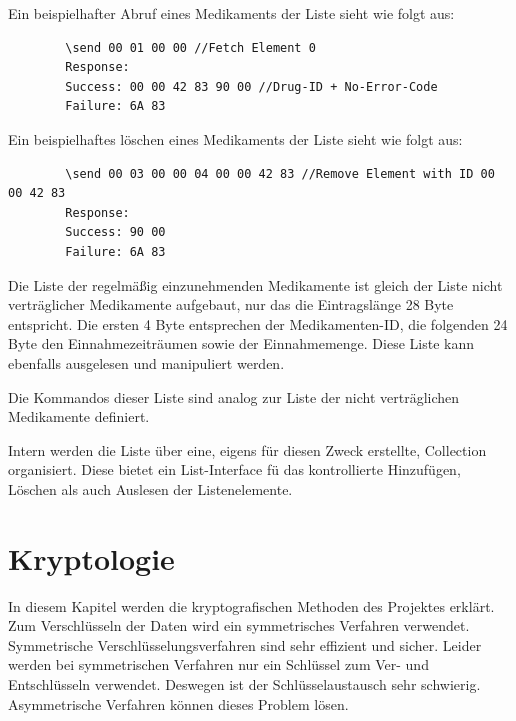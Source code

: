 \documentclass[parskip]{scrartcl}
\begin{document}
	Ein beispielhafter Abruf eines Medikaments der Liste sieht wie folgt aus:
	
	\begin{lstlisting}
		\send 00 01 00 00 //Fetch Element 0
		Response:
		Success: 00 00 42 83 90 00 //Drug-ID + No-Error-Code
		Failure: 6A 83
	\end{lstlisting}
	
	Ein beispielhaftes löschen eines Medikaments der Liste sieht wie folgt aus:
		
	\begin{lstlisting}
		\send 00 03 00 00 04 00 00 42 83 //Remove Element with ID 00 00 42 83
		Response:
		Success: 90 00
		Failure: 6A 83
	\end{lstlisting}
	
	Die Liste der regelmäßig einzunehmenden Medikamente ist gleich der Liste nicht verträglicher Medikamente aufgebaut, nur das die Eintragslänge 28 Byte entspricht. Die ersten 4 Byte entsprechen der Medikamenten-ID, die folgenden 24 Byte den Einnahmezeiträumen sowie der Einnahmemenge. Diese Liste kann ebenfalls ausgelesen und manipuliert werden.
	
	Die Kommandos dieser Liste sind analog zur Liste der nicht verträglichen Medikamente definiert.
	
	Intern werden die Liste über eine, eigens für diesen Zweck erstellte, Collection organisiert. Diese bietet ein List-Interface fü das kontrollierte Hinzufügen, Löschen als auch Auslesen der Listenelemente.
\section{Kryptologie}
In diesem Kapitel werden die kryptografischen Methoden des Projektes erklärt. Zum Verschlüsseln der Daten wird ein symmetrisches Verfahren verwendet. Symmetrische Verschlüsselungsverfahren sind sehr effizient und sicher. Leider werden bei symmetrischen Verfahren nur ein Schlüssel zum Ver- und Entschlüsseln verwendet. Deswegen ist der Schlüsselaustausch sehr schwierig. Asymmetrische Verfahren können dieses Problem lösen.
\end{document}
